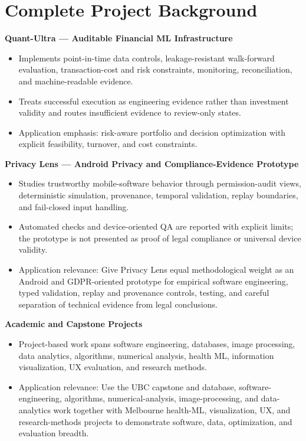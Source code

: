 \documentclass[11pt]{article}
\begin{document}
\section*{Complete Project Background}
\textbf{Quant-Ultra --- Auditable Financial ML Infrastructure}
\begin{itemize}
\item Implements point-in-time data controls, leakage-resistant walk-forward evaluation, transaction-cost and risk constraints, monitoring, reconciliation, and machine-readable evidence.
\item Treats successful execution as engineering evidence rather than investment validity and routes insufficient evidence to review-only states.
\item Application emphasis: risk-aware portfolio and decision optimization with explicit feasibility, turnover, and cost constraints.
\end{itemize}

\textbf{Privacy Lens --- Android Privacy and Compliance-Evidence Prototype}
\begin{itemize}
\item Studies trustworthy mobile-software behavior through permission-audit views, deterministic simulation, provenance, temporal validation, replay boundaries, and fail-closed input handling.
\item Automated checks and device-oriented QA are reported with explicit limits; the prototype is not presented as proof of legal compliance or universal device validity.
\item Application relevance: Give Privacy Lens equal methodological weight as an Android and GDPR-oriented prototype for empirical software engineering, typed validation, replay and provenance controls, testing, and careful separation of technical evidence from legal conclusions.
\end{itemize}

\textbf{Academic and Capstone Projects}
\begin{itemize}
\item Project-based work spans software engineering, databases, image processing, data analytics, algorithms, numerical analysis, health ML, information visualization, UX evaluation, and research methods.
\item Application relevance: Use the UBC capstone and database, software-engineering, algorithms, numerical-analysis, image-processing, and data-analytics work together with Melbourne health-ML, visualization, UX, and research-methods projects to demonstrate software, data, optimization, and evaluation breadth.
\end{itemize}
\end{document}
